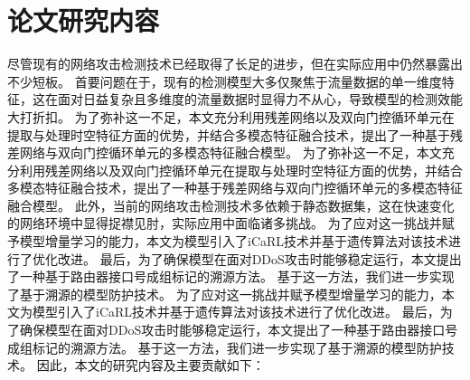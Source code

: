 \section{论文研究内容}



尽管现有的网络攻击检测技术已经取得了长足的进步，但在实际应用中仍然暴露出不少短板。
首要问题在于，现有的检测模型大多仅聚焦于流量数据的单一维度特征，这在面对日益复杂且多维度的流量数据时显得力不从心，导致模型的检测效能大打折扣。
为了弥补这一不足，本文充分利用残差网络以及双向门控循环单元在提取与处理时空特征方面的优势，并结合多模态特征融合技术，提出了一种基于残差网络与双向门控循环单元的多模态特征融合模型。
为了弥补这一不足，本文充分利用残差网络以及双向门控循环单元在提取与处理时空特征方面的优势，并结合多模态特征融合技术，提出了一种基于残差网络与双向门控循环单元的多模态特征融合模型。
此外，当前的网络攻击检测技术多依赖于静态数据集，这在快速变化的网络环境中显得捉襟见肘，实际应用中面临诸多挑战。
为了应对这一挑战并赋予模型增量学习的能力，本文为模型引入了iCaRL技术并基于遗传算法对该技术进行了优化改进。
最后，为了确保模型在面对DDoS攻击时能够稳定运行，本文提出了一种基于路由器接口号成组标记的溯源方法。
基于这一方法，我们进一步实现了基于溯源的模型防护技术。
为了应对这一挑战并赋予模型增量学习的能力，本文为模型引入了iCaRL技术并基于遗传算法对该技术进行了优化改进。
最后，为了确保模型在面对DDoS攻击时能够稳定运行，本文提出了一种基于路由器接口号成组标记的溯源方法。
基于这一方法，我们进一步实现了基于溯源的模型防护技术。
因此，本文的研究内容及主要贡献如下：\par

